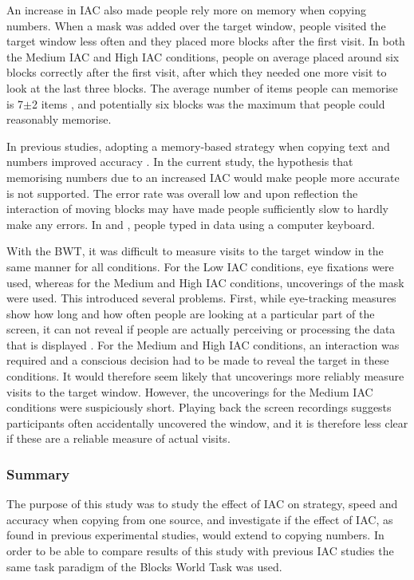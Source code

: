 \documentclass[11pt,oneside]{report}
\begin{document}
\begin{table}
An increase in IAC also made people rely more on memory when copying numbers. When a mask was added over the target window, people visited the target window less often and they placed more blocks after the first visit. In both the Medium IAC and High IAC conditions, people on average placed around six blocks correctly after the first visit, after which they needed one more visit to look at the last three blocks. The average number of items people can memorise is 7$\pm$2 items \citep{Miller1956}, and potentially six blocks was the maximum that people could reasonably memorise.

In previous studies, adopting a memory-based strategy when copying text and numbers improved accuracy \citep{Gray2004, Soboczenski2013}. In the current study, the hypothesis that memorising numbers due to an increased IAC would make people more accurate is not supported. 
The error rate was overall low and upon reflection the interaction of moving blocks may have made people sufficiently slow to hardly make any errors. In \citet{Gray2004} and \citet{Soboczenski2013}, people typed in data using a computer keyboard.

With the BWT, it was difficult to measure visits to the target window in the same manner for all conditions. For the Low IAC conditions, eye fixations were used, whereas for the Medium and High IAC conditions, uncoverings of the mask were used. This introduced several problems. First, while eye-tracking measures show how long and how often people are looking at a particular part of the screen, it can not reveal if people are actually perceiving or processing the data that is displayed \citep{Waldron2007}. For the Medium and High IAC conditions, an interaction was required and a conscious decision had to be made to reveal the target in these conditions. It would therefore seem likely that uncoverings more reliably measure visits to the target window. However, the uncoverings for the Medium IAC conditions were suspiciously short. Playing back the screen recordings suggests participants often accidentally uncovered the window, and it is therefore less clear if these are a reliable measure of actual visits. 

\subsubsection{Summary}
The purpose of this study was to study the effect of IAC on strategy, speed and accuracy when copying from one source, and investigate if the effect of IAC, as found in previous experimental studies, would extend to copying numbers. In order to be able to compare results of this study with previous IAC studies the same task paradigm of the Blocks World Task was used.


\end{table}
\end{document}
